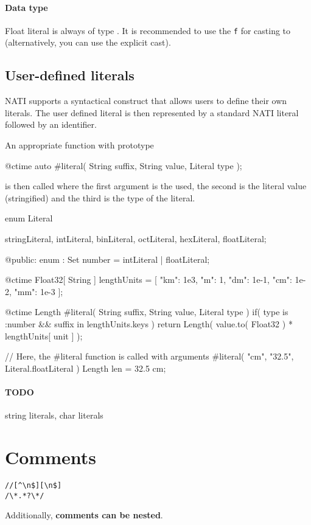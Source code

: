 \paragraph{Data type} Float literal is always of type . It is recommended to use the \verb|f| for casting to  (alternatively, you can use the explicit cast).

\subsection{User-defined literals} \label{userDefinedLiterals}
NATI supports a syntactical construct that allows users to define their own literals. The user defined literal is then represented by a standard NATI literal followed by an identifier.

An appropriate function with prototype
\begin{code}
@ctime auto #literal( String suffix, String value, Literal type );
\end{code}
is then called where the first argument is the  used, the second is the literal value (stringified) and the third is the type of the literal.

\begin{code}
enum Literal {
	stringLiteral,
	intLiteral,
	binLiteral,
	octLiteral,
	hexLiteral,
	floatLiteral;
	
@public:
	enum : Set {
		number = intLiteral | floatLiteral;	
	}
}
\end{code}

\begin{code}
@ctime Float32[ String ] lengthUnits = [
	"km": 1e3, "m": 1, "dm": 1e-1, "cm": 1e-2, "mm": 1e-3
];
	
@ctime Length #literal( String suffix, String value, Literal type )
	if( type is :number && suffix in lengthUnits.keys )
{
	return Length( value.to( Float32 ) * lengthUnits[ unit ] );
}

// Here, the #literal function is called with arguments #literal( "cm", "32.5", Literal.floatLiteral )
Length len = 32.5 cm;
\end{code}

\paragraph{TODO} string literals, char literals

\section{Comments}
\begin{grammar}
	 \verb|//[^\n$][\n$]| \\
	 \verb|/\*.*?\*/|
\end{grammar}
Additionally, \textbf{comments can be nested}.

